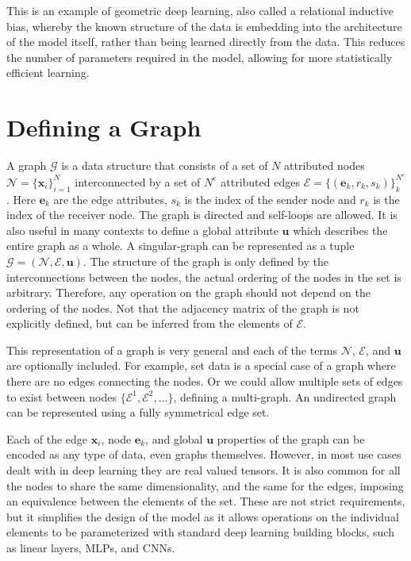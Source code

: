This is an example of geometric deep learning, also called a relational inductive bias, whereby the known structure of the data is embedding into the architecture of the model itself, rather than being learned directly from the data.
This reduces the number of parameters required in the model, allowing for more statistically efficient learning.

\section{Defining a Graph}

A graph $\mathcal{G}$ is a data structure that consists of a set of $N$ attributed nodes $\mathcal{N} = \{\mathbf{x}_i\}_{i=1}^{N}$ interconnected by a set of $N^e$ attributed edges $\mathcal{E} = \{(\mathbf{e}_{k}, r_k, s_k)\}_{k}^{N^e}$.
Here $\mathbf{e}_{k}$ are the edge attributes, $s_k$ is the index of the sender node and $r_k$ is the index of the receiver node.
The graph is directed and self-loops are allowed.
It is also useful in many contexts to define a global attribute $\mathbf{u}$ which describes the entire graph as a whole.
A singular-graph can be represented as a tuple $\mathcal{G} = (\mathcal{N}, \mathcal{E}, \mathbf{u})$.
The structure of the graph is only defined by the interconnections between the nodes, the actual ordering of the nodes in the set is arbitrary.
Therefore, any operation on the graph should not depend on the ordering of the nodes.
Not that the adjacency matrix of the graph is not explicitly defined, but can be inferred from the elements of $\mathcal{E}$.

This representation of a graph is very general and each of the terms $\mathcal{N}$, $\mathcal{E}$, and $\mathbf{u}$ are optionally included.
For example, set data is a special case of a graph where there are no edges connecting the nodes.
Or we could allow multiple sets of edges to exist between nodes $\{\mathcal{E}^1, \mathcal{E}^2, \ldots\}$, defining a multi-graph.
An undirected graph can be represented using a fully symmetrical edge set.

Each of the edge $\mathbf{x}_i$, node $\mathbf{e}_{k}$, and global $\mathbf{u}$ properties of the graph can be encoded as any type of data, even graphs themselves.
However, in most use cases dealt with in deep learning they are real valued tensors.
It is also common for all the nodes to share the same dimensionality, and the same for the edges, imposing an equivalence between the elements of the set.
These are not strict requirements, but it simplifies the design of the model as it allows operations on the individual elements to be parameterized with standard deep learning building blocks, such as linear layers, MLPs, and CNNs.

